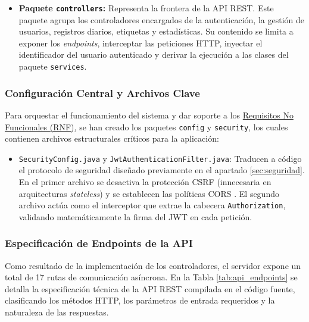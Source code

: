 \begin{itemize}
\begin{itemize}
              \item \texttt{EstadisticasService.java}: Materializa el \textbf{EstadísticasMgr}. Su contenido implementa algoritmos matemáticos apoyados en la API \textit{Streams} de Java, extrayendo el ``mejor y peor aliado'' emocional en tiempo de ejecución de manera eficiente.
          \end{itemize}
          \item \textbf{Paquete \texttt{controllers}:} Representa la frontera de la API REST. Este paquete agrupa los controladores encargados de la autenticación, la gestión de usuarios, registros diarios, etiquetas y estadísticas. Su contenido se limita a exponer los \textit{endpoints}, interceptar las peticiones HTTP, inyectar el identificador del usuario autenticado y derivar la ejecución a las clases del paquete \texttt{services}.\end{itemize}
\subsubsection{Configuración Central y Archivos Clave}

Para orquestar el funcionamiento del sistema y dar soporte a los \hyperref[tab:rnf_total]{Requisitos No Funcionales (RNF)}, se han creado los paquetes \texttt{config} y \texttt{security}, los cuales contienen archivos estructurales críticos para la aplicación:

\begin{itemize}
    \item \texttt{SecurityConfig.java} y \texttt{JwtAuthenticationFilter.java}: Traducen a código el protocolo de seguridad diseñado previamente en el apartado \ref{sec:seguridad}. En el primer archivo se desactiva la protección CSRF (innecesaria en arquitecturas \textit{stateless}) y se establecen las políticas CORS \cite{bib:cors}. El segundo archivo actúa como el interceptor que extrae la cabecera \texttt{Authorization}, validando matemáticamente la firma del JWT en cada petición.
\end{itemize}

\newpage

\subsubsection{Especificación de Endpoints de la API}

Como resultado de la implementación de los controladores, el servidor expone un total de 17 rutas de comunicación asíncrona. En la Tabla \ref{tab:api_endpoints} se detalla la especificación técnica de la API REST compilada en el código fuente, clasificando los métodos HTTP, los parámetros de entrada requeridos y la naturaleza de las respuestas.

